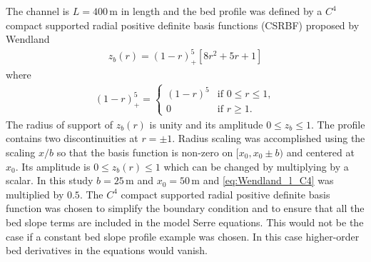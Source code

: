 \documentclass[preprint,sort&compress,1p]{article}
\begin{document}
The channel is $L = 400$\,m in length and the bed profile was defined by a $C^4$  compact supported radial positive definite basis functions (CSRBF) proposed by Wendland~\cite{Wendland-H-1995-389}
\begin{gather}
z_b(r) = (1 - r)_+^{5}\left [8 r^2 + 5 r + 1 \right ]
\label{eq:Wendland_l_C4}
\end{gather}
where
\begin{gather}
(1 - r)_+^5 = \left \{ \begin{array}{cl}
                                     (1 - r)^5 & \text{if} \,\, 0 \le r \le 1, \\
                                     0 & \text{if} \,\, r \ge 1.
                                   \end{array} \right .
\end{gather}
The radius of support of $z_b(r)$ is unity and its amplitude $0 \le z_b \le 1$. The profile contains two discontinuities at $r = \pm 1$. Radius scaling was accomplished using the scaling $x/b$ so that the basis function is non-zero on $[x_0, x_0 \pm b)$ and centered at $x_0$. Its amplitude is $0 \le z_b(r) \le 1$ which can be changed by multiplying by a scalar. In this study $b =  25$\,m and $x_0 = 50$\,m and \eqref{eq:Wendland_l_C4} was multiplied by $0.5$. The $C^4$ compact supported radial positive definite basis function was chosen to simplify the boundary condition and to ensure that all the bed slope terms are included in the model Serre equations. This would not be the case if a constant bed slope profile example was chosen. In this case higher-order bed derivatives in the equations would vanish.
\end{document}
